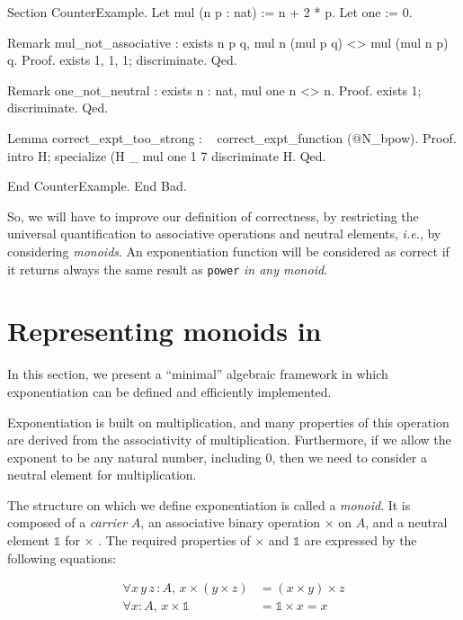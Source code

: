 \begin{Coqbad}
Section CounterExample.
    Let mul (n p : nat) := n + 2 * p.
    Let one := 0.

    Remark mul_not_associative :
      exists  n p q,  mul n (mul p q) <> mul (mul n p) q.
    Proof. 
        exists 1, 1, 1; discriminate. 
    Qed.

    Remark one_not_neutral  :
      exists n : nat, mul one n <> n.
    Proof.
      exists 1; discriminate.
    Qed.

    Lemma correct_expt_too_strong : 
          ~ correct_expt_function (@N_bpow).
    Proof.
      intro H; specialize (H _ mul one 1  7%
      discriminate H.    
    Qed.

End CounterExample.
End Bad.
 \end{Coqbad}


So, we will have to improve our definition of correctness, by restricting  the universal quantification to associative operations and neutral elements, \emph{i.e.}, by considering \emph{monoids}.
An exponentiation  function will be considered as correct if it returns always the same result as \texttt{power} \emph{in any monoid}.



\section{Representing monoids in \coq \label{monoid-class-def}}

In this section, we present a ``minimal'' algebraic framework in which  exponentiation can be defined and efficiently implemented.

Exponentiation is built on multiplication, and many properties of 
this operation are derived from the associativity of multiplication. 
Furthermore, if we allow the exponent to be any natural number, including $0$, 
then we need to consider a neutral element for multiplication.

The structure on which we define exponentiation is called a \emph{monoid}.
It is composed of a \emph{carrier} $A$, an associative binary operation $\times$ on $A$, and a neutral element $\mathds{1}$ for $\times$ . The required properties of $\times$ and
$\mathds{1}$ are expressed by the following equations:


\begin{align}
  \label{eq}
  \forall x\,y\,z\,:A,\, x\times (y \times z) &= (x\times y) \times z
  \\
\forall x:A,\, x \times \mathds{1}  &= \mathds{1}  \times x = x
\end{align}



